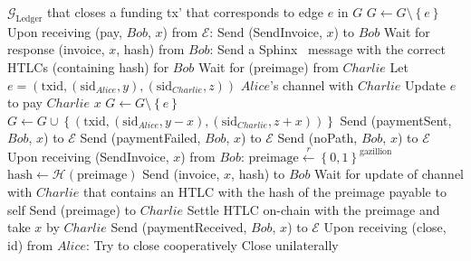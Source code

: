 \begin{algorithmic}[1]
{      $\mathcal{G}_{\mathrm{Ledger}}$ that closes a funding tx' that corresponds to edge
      $e$ in $G$}
        \State $G \leftarrow G \setminus \left\{e\right\}$
      \EndIf
    \State
    \State Upon receiving (pay, $Bob$, $x$) from $\mathcal{E}$:
      \State Send (SendInvoice, $x$) to $Bob$
      \State Wait for response (invoice, $x$, hash) from $Bob$:
        \State Send a Sphinx~\cite{sphinx} message with the correct HTLCs (containing
        hash) for $Bob$
        \State {}
        \State Wait for (preimage) from $Charlie$
          \State Let $e = \left(\mathrm{txid}, \left(\mathrm{sid}_{Alice}, y\right),
          \left(\mathrm{sid}_{Charlie}, z\right)\right)$ $Alice$'s channel with $Charlie$
          \State Update $e$ to pay $Charlie$ $x$ 
          \State $G \leftarrow G \setminus \left\{e\right\}$
          \State $G \leftarrow G \cup \left\{\left(\mathrm{txid},
          \left(\mathrm{sid}_{Alice}, y - x\right), \left(\mathrm{sid}_{Charlie}, z +
          x\right)\right)\right\}$
          \State Send (paymentSent, $Bob$, $x$) to $\mathcal{E}$
        \Else
          \State Send (paymentFailed, $Bob$, $x$) to $\mathcal{E}$
        \EndIf
      \Else
        \State Send (noPath, $Bob$, $x$) to $\mathcal{E}$
      \EndIf
    \State
    \State Upon receiving (SendInvoice, $x$) from $Bob$:
      \State $\mathrm{preimage} \overset{r}{\leftarrow}
      \left\{0,1\right\}^{\mathrm{gazillion}}$
      \State $\mathrm{hash} \leftarrow \mathcal{H}\left(\mathrm{preimage}\right)$
      \State Send (invoice, $x$, hash) to $Bob$
      \State Wait for update of channel with $Charlie$ that contains an HTLC with the hash
      of the preimage payable to self
      \State Send (preimage) to $Charlie$
        \State Settle HTLC on-chain with the preimage and take $x$ by $Charlie$
      \EndIf
      \State Send (paymentReceived, $Bob$, $x$) to $\mathcal{E}$
    \State
    \State Upon receiving (close, id) from $Alice$:
        \State Try to close cooperatively 
         
          \State Close unilaterally 
        \EndIf
      \EndIf
  \end{algorithmic}
\hrulefill
